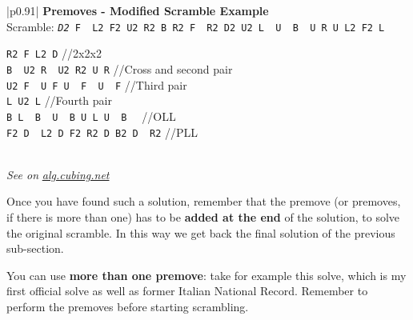 \documentclass[11pt,a4paper]{book}
\newcommand{\p}{\textquotesingle}
\newcommand{\m}{\texttt}
\newcommand{\ps}{\p\,\,}
\newcommand{\comment}[1]{{\color{gray}\quad//#1}}
\begin{document}
\bigskip
\begin{tabular}{|p{}|}
\hline
\textbf{Premoves - Modified Scramble Example}\\
\hline
Scramble: \m{\emph{D2} F\ps L2 F2 U2 R2 B R2 F\ps R2 D2 U2 L\ps U\ps B\ps U R U L2 F2 L\p}\\
\hline
\begin{minipage}[l]{0.650\textwidth}
\m{R2 F L2 D\p} \comment{2x2x2}\\
\m{B\ps U2 R\ps U2 R2 U R} \comment{Cross and second pair}\\
\m{U2 F\ps U F U\ps F\ps U\ps F} \comment{Third pair}\\
\m{L U2 L\p} \comment{Fourth pair}\\
\m{B L\ps B\ps U\ps B U L U\ps B\ps} \comment{OLL}\\
\m{F2 D\ps L2 D F2 R2 D B2 D\ps R2} \comment{PLL}
\end{minipage}
\begin{minipage}[c]{0.25\textwidth}

\end{minipage}\\
\hline
\emph{See on }\href{https://alg.cubing.net/?setup=D2_F-_L2_F2_U2_R2_B_R2_F-_R2_D2_U2_L-_U-_B-_U_R_U_L2_F2_L-&alg=R2_F_L2_D-_\%2F\%2F2x2x2\%0AB-_U2_R-_U2_R2_U_R_\%2F\%2FCross_and_second_pair\%0AU2_F-_U_F_U-_F-_U-_F_\%2F\%2FThird_pair\%0AL_U2_L-_\%2F\%2FFourth_pair\%0AB_L-_B-_U-_B_U_L_U-_B-_\%2F\%2FOLL\%0AF2_D-_L2_D_F2_R2_D_B2_D-_R2_\%2F\%2FPLL}{\emph{alg.cubing.net}}\\
\hline
\end{tabular}
\bigskip

Once you have found such a solution, remember that the premove (or premoves, if there is more than one) has to be \textbf{added at the end} of the solution, to solve the original scramble. In this way we get back the final solution of the previous sub-section.

You can use \textbf{more than one premove}: take for example this solve, which is my first official solve as well as former Italian National Record. Remember to perform the premoves before starting scrambling.
\end{document}
